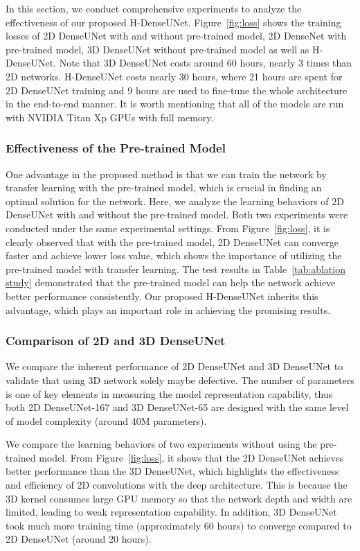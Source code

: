 \documentclass[journal]{IEEEtran}
\begin{document}
In this section, we conduct comprehensive experiments to analyze the effectiveness of our proposed H-DenseUNet.
Figure~\ref{fig:loss} shows the training losses of 2D DenseUNet with and without pre-trained model, 2D DenseNet with pre-trained model, 3D DenseUNet without pre-trained model as well as H-DenseUNet. Note that 3D DenseUNet costs around 60 hours, nearly 3 times than 2D networks. H-DenseUNet costs nearly 30 hours, where 21 hours are spent for 2D DenseUNet training and 9 hours are used to fine-tune the whole architecture in the end-to-end manner. It is worth mentioning that all of the models are run with NVIDIA Titan Xp GPUs with full memory.
\subsubsection{Effectiveness of the Pre-trained Model}
One advantage in the proposed method is that we can train the network by transfer learning with the pre-trained model, which is crucial in finding an optimal solution for the network. Here, we analyze the learning behaviors of 2D DenseUNet with and without the pre-trained model. Both two experiments were conducted under the same experimental settings. From Figure~\ref{fig:loss}, it is clearly observed that with the pre-trained model, 2D DenseUNet can converge faster and achieve lower loss value, which shows the importance of utilizing the pre-trained model with transfer learning. The test results in Table~\ref{tab:ablation study} demonstrated that the pre-trained model can help the network achieve better performance consistently. Our proposed H-DenseUNet inherits this advantage, which plays an important role in achieving the promising results.
\subsubsection{Comparison of 2D and 3D DenseUNet}
We compare the inherent performance of 2D DenseUNet and 3D DenseUNet to validate that using 3D network solely maybe defective.
The number of parameters is one of key elements in measuring the model representation capability, thus both 2D DenseUNet-167 and 3D DenseUNet-65 are designed with the same level of model complexity (around 40M parameters).


We compare the learning behaviors of two experiments without using the pre-trained model. From Figure~\ref{fig:loss}, it shows that the 2D DenseUNet achieves better performance than the 3D DenseUNet, which highlights the effectiveness and efficiency of 2D convolutions with the deep architecture. This is because the 3D kernel consumes large GPU memory so that the network depth and width are limited, leading to weak representation capability.
In addition, 3D DenseUNet took much more training time (approximately 60 hours) to converge compared to 2D DenseUNet (around 20 hours).
\end{document}
